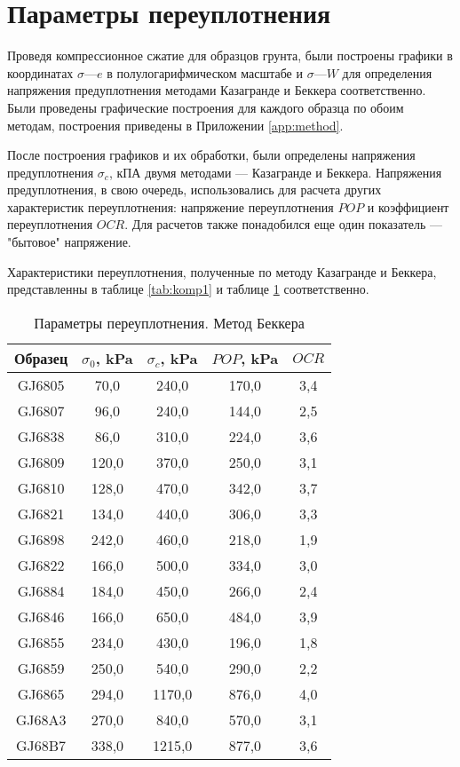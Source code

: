\section{Параметры переуплотнения}

Проведя компрессионное сжатие для образцов грунта, были построены 
графики в координатах $\sigma \text{---} e$ 
в полулогарифмическом масштабе и $\sigma \text{---} W$ для определения напряжения предуплотнения 
методами Казагранде и Беккера соответственно. Были проведены 
графические построения для каждого образца по обоим 
методам, построения приведены в Приложении \ref{app:method}.

После построения графиков и их обработки, были определены 
напряжения предуплотнения $\sigma_c$, кПА двумя методами ---
Казагранде и Беккера. 
Напряжения предуплотнения, в свою очередь, использовались для расчета 
других характеристик переуплотнения: напряжение 
переуплотнения $POP$ и коэффициент переуплотнения $OCR$.
Для расчетов также понадобился еще один показатель --- 
"бытовое" напряжение.

Характеристики переуплотнения, полученные по методу Казагранде и Беккера,
представленны в таблице \ref{tab:komp1} и таблице \ref{tab:komp2} соответственно.

\begin{table}[]
  \centering
  \begin{threeparttable}
    \caption{Параметры переуплотнения. Метод Беккера}\label{tab:komp2}
  \begin{tabular}{|c|c|c|c|c|}
  \hline
  Образец  & $\sigma_0$, \si{\kilo\Pa} & $\sigma_c$, \si{\kilo\Pa} & $POP$, \si{\kilo\Pa}   & $OCR$ \\ \hline
  GJ6805 & 70,0  & 240,0  & 170,0 & 3,4 \\ \hline
GJ6807 & 96,0  & 240,0  & 144,0 & 2,5 \\ \hline
GJ6838 & 86,0  & 310,0  & 224,0 & 3,6 \\ \hline
GJ6809 & 120,0 & 370,0  & 250,0 & 3,1 \\ \hline
GJ6810 & 128,0 & 470,0  & 342,0 & 3,7 \\ \hline
GJ6821 & 134,0 & 440,0  & 306,0 & 3,3 \\ \hline
GJ6898 & 242,0 & 460,0  & 218,0 & 1,9 \\ \hline
GJ6822 & 166,0 & 500,0  & 334,0 & 3,0 \\ \hline
GJ6884 & 184,0 & 450,0  & 266,0 & 2,4 \\ \hline
GJ6846 & 166,0 & 650,0  & 484,0 & 3,9 \\ \hline
GJ6855 & 234,0 & 430,0  & 196,0 & 1,8 \\ \hline
GJ6859 & 250,0 & 540,0  & 290,0 & 2,2 \\ \hline
GJ6865 & 294,0 & 1170,0 & 876,0 & 4,0 \\ \hline
GJ68A3 & 270,0 & 840,0  & 570,0 & 3,1 \\ \hline
GJ68B7 & 338,0 & 1215,0 & 877,0 & 3,6 \\ \hline
  \end{tabular}
\end{threeparttable}
  \end{table}

